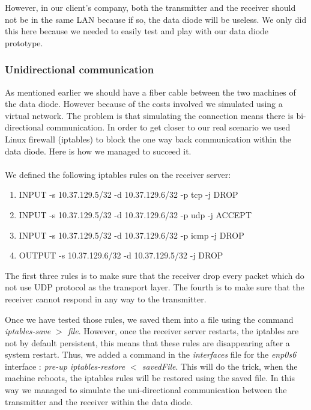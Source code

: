\documentclass[a4paper,10pt]{article}
\begin{document}
However, in our client's company, both the transmitter and the receiver should not be in the same LAN because if so, the data diode will be useless. We only did this here because we needed to easily test and play with our data diode prototype.
\subsubsection{Unidirectional communication}
As mentioned earlier we should have a fiber cable between the two machines of the data diode. However because of the costs involved we simulated using a virtual network. The problem is that simulating the connection means there is bi-directional communication. In order to get closer to our real scenario we used Linux firewall (iptables) to block the one way back communication within the data diode. Here is how we managed to succeed it.

\paragraph{}We defined the following iptables rules on the receiver server:
\begin{enumerate}
\item INPUT -s 10.37.129.5/32 -d 10.37.129.6/32 -p tcp -j DROP
\item INPUT -s 10.37.129.5/32 -d 10.37.129.6/32 -p udp -j ACCEPT
\item INPUT -s 10.37.129.5/32 -d 10.37.129.6/32 -p icmp -j DROP
\item OUTPUT -s 10.37.129.6/32 -d 10.37.129.5/32 -j DROP
\end{enumerate}

The first three rules is to make sure that the receiver drop every packet which do not use UDP protocol as the transport layer. The fourth is to make sure that the receiver cannot respond in any way to the transmitter.

Once we have tested those rules, we saved them into a file using the command \emph{iptables-save $>$ file}. However, once the receiver server restarts, the iptables are not by default persistent, this means that these rules are disappearing after a system restart. Thus, we added a command in the \emph{interfaces} file for the \emph{enp0s6} interface : \emph{pre-up iptables-restore $<$ savedFile}. This will do the trick, when the machine reboots, the iptables rules will be restored using the saved file. In this way we managed to simulate the uni-directional communication between the transmitter and the receiver within the data diode.
\end{document}
